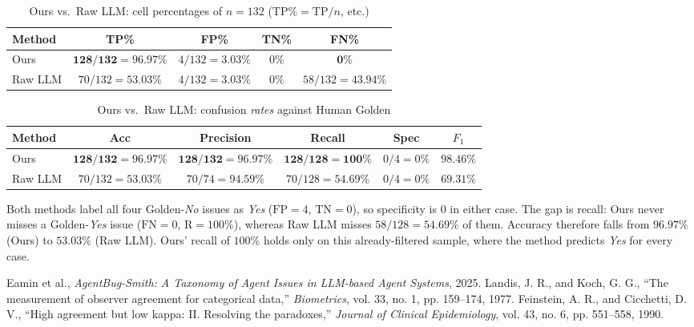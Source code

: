 \documentclass[11pt]{article}
\begin{document}
\begin{table}[htbp]
  \caption{Ours vs.\ Raw LLM: cell percentages of $n=132$ ($\mathrm{TP}\%=\mathrm{TP}/n$, etc.)}
  \label{tab:ours-vs-raw-cellpct}
  \centering
  \begin{tabular}{lcccc}
    \toprule
    \textbf{Method} & TP\% & FP\% & TN\% & FN\% \\
    \midrule
    Ours     & $\mathbf{128/132=96.97\%}$ & $4/132=3.03\%$ & $0\%$ & $\mathbf{0\%}$ \\
    Raw LLM  & $70/132=53.03\%$ & $4/132=3.03\%$ & $0\%$ & $58/132=43.94\%$ \\
    \bottomrule
  \end{tabular}
\end{table}

\begin{table}[htbp]
  \caption{Ours vs.\ Raw LLM: confusion \emph{rates} against Human Golden}
  \label{tab:ours-vs-raw-rates}
  \centering
  \small
  \begin{tabular}{lccccc}
    \toprule
    \textbf{Method} & Acc & Precision & Recall & Spec & $F_1$ \\
    \midrule
    Ours     & $\mathbf{128/132=96.97\%}$ & $\mathbf{128/132=96.97\%}$ & $\mathbf{128/128=100\%}$ & $0/4=0\%$ & $\mathbf{98.46\%}$ \\
    Raw LLM  & $70/132=53.03\%$ & $70/74=94.59\%$ & $70/128=54.69\%$ & $0/4=0\%$ & $69.31\%$ \\
    \bottomrule
  \end{tabular}
\end{table}

Both methods label all four Golden-\emph{No} issues as \emph{Yes} ($\mathrm{FP}=4$, $\mathrm{TN}=0$), so specificity is 0 in either case. The gap is recall: Ours never misses a Golden-\emph{Yes} issue ($\mathrm{FN}=0$, $\mathrm{R}=100\%$), whereas Raw LLM misses $58/128=54.69\%$ of them. Accuracy therefore falls from $96.97\%$ (Ours) to $53.03\%$ (Raw LLM). Ours' recall of $100\%$ holds only on this already-filtered sample, where the method predicts \emph{Yes} for every case.

\begin{thebibliography}{99}
   Eamin et al., \textit{AgentBug-Smith: A Taxonomy of Agent Issues in LLM-based Agent Systems}, 2025.
   Landis, J. R., and Koch, G. G., ``The measurement of observer agreement for categorical data,'' \textit{Biometrics}, vol. 33, no. 1, pp. 159--174, 1977.
   Feinstein, A. R., and Cicchetti, D. V., ``High agreement but low kappa: II. Resolving the paradoxes,'' \textit{Journal of Clinical Epidemiology}, vol. 43, no. 6, pp. 551--558, 1990.
\end{thebibliography}
\end{document}
